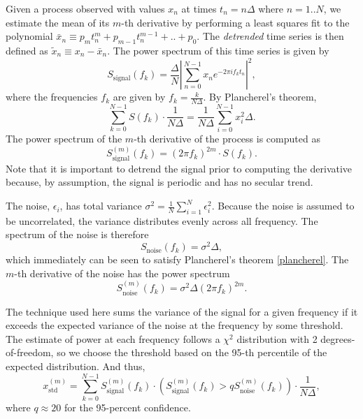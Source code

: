 \documentclass{ametsoc}
\begin{document}
Given a process observed with values $x_n$ at times $t_n = n \Delta$ where $n=1..N$, we estimate the mean of its $m$-th derivative by performing a least squares fit to the polynomial $\bar{x}_n \equiv p_m t_n^m + p_{m-1} t_n^{m-1} + .. + p_0$. The \emph{detrended} time series is then defined as $\tilde{x}_n \equiv x_n - \bar{x}_n$. The power spectrum of this time series is given by
\begin{equation}
S_{\textrm{signal}}(f_k) = \frac{\Delta}{N} \left\lvert \sum_{n=0}^{N-1} x_n e^{-2\pi i f_k t_n} \right\rvert^2,
\end{equation}
where the frequencies $f_k$ are given by $f_k = \frac{k}{N\Delta}$. %
By Plancherel's theorem,
\begin{equation}
\label{plancherel}
\sum_{k=0}^{N-1} S(f_k) \cdot \frac{1}{N \Delta} = \frac{1}{N \Delta} \sum_{i=0}^{N-1} x_i^2 \Delta.
\end{equation}
The power spectrum of the $m$-th derivative of the process is computed as
\begin{equation}
S_{\textrm{signal}}^{(m)}(f_k) = (2 \pi f_k)^{2m} \cdot S(f_k).
\end{equation}
Note that it is important to detrend the signal prior to computing the derivative because, by assumption, the signal is periodic and has no secular trend.

The noise, $\epsilon_i$, has total variance $\sigma^2 = \frac{1}{N} \sum_{i=1}^{N} \epsilon_i^2$. Because the noise is assumed to be uncorrelated, the variance distributes evenly across all frequency. The spectrum of the noise is therefore
\begin{equation}
S_{\textrm{noise}}(f_k) = \sigma^2 \Delta,
\end{equation}
which immediately can be seen to satisfy Plancherel's theorem \eqref{plancherel}. The $m$-th derivative of the noise has the power spectrum
\begin{equation}
S_{\textrm{noise}}^{(m)}(f_k) = \sigma^2 \Delta (2 \pi f_k)^{2m}.
\end{equation}

The technique used here sums the variance of the signal for a given frequency if it exceeds the expected variance of the noise at the frequency by some threshold. The estimate of power at each frequency follows a $\chi^2$ distribution with 2 degrees-of-freedom, so we choose the threshold based on the 95-th percentile of the expected distribution. And thus,
\begin{equation}
x^{(m)}_{\textrm{std}} = \sum_{k=0}^{N-1} S^{(m)}_{\textrm{signal}}(f_k) \cdot \left( S^{(m)}_{\textrm{signal}}(f_k) > q S_{\textrm{noise}}^{(m)}(f_k) \right) \cdot \frac{1}{N \Delta},
\end{equation}
where $q\approx 20$ for the 95-percent confidence.





\end{document}

